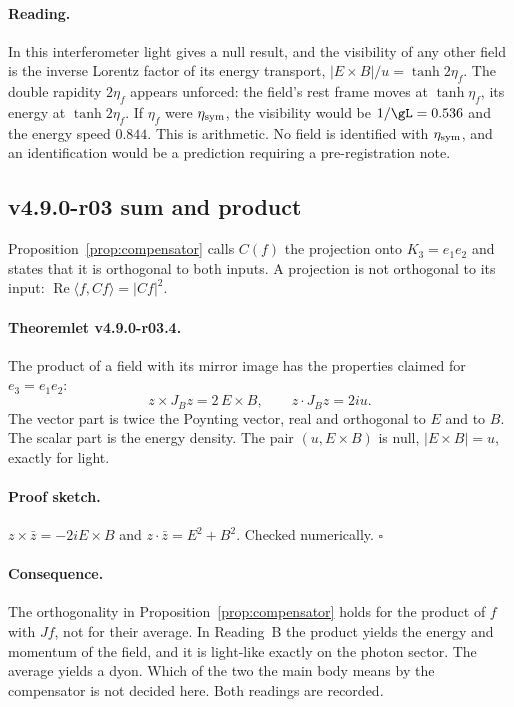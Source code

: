 \paragraph{Reading.}
In this interferometer light gives a null result, and the visibility of any other field is the inverse Lorentz factor of
its energy transport, \(|E\times B|/u=\tanh2\eta_f\).  The double rapidity \(2\eta_f\) appears unforced: the field's rest
frame moves at \(\tanh\eta_f\), its energy at \(\tanh2\eta_f\).  If \(\eta_f\) were \(\eta_{\rm sym}\), the visibility would be
\(1/\gL=0.536\) and the energy speed \(0.844\).  This is arithmetic.  No field is identified with \(\eta_{\rm sym}\), and an
identification would be a prediction requiring a pre-registration note.

\subsection*{v4.9.0-r03 sum and product}
\label{subsec:v490-r03-product}

Proposition~\ref{prop:compensator} calls \(C(f)\) the projection onto \(K_3=e_1e_2\) and states that it is orthogonal to
both inputs.  A projection is not orthogonal to its input: \(\operatorname{Re}\langle f,Cf\rangle=|Cf|^2\).

\paragraph{Theoremlet v4.9.0-r03.4.}
The product of a field with its mirror image has the properties claimed for \(e_3=e_1e_2\):
\[
z\times J_Bz=2\,E\times B,\qquad z\cdot J_Bz=2iu .
\]
The vector part is twice the Poynting vector, real and orthogonal to \(E\) and to \(B\).  The scalar part is the energy
density.  The pair \((u,E\times B)\) is null, \(|E\times B|=u\), exactly for light.

\paragraph{Proof sketch.}
\(z\times\bar z=-2iE\times B\) and \(z\cdot\bar z=E^2+B^2\).  Checked numerically.  \(\square\)

\paragraph{Consequence.}
The orthogonality in Proposition~\ref{prop:compensator} holds for the product of \(f\) with \(Jf\), not for their
average.  In Reading~B the product yields the energy and momentum of the field, and it is light-like exactly on the
photon sector.  The average yields a dyon.  Which of the two the main body means by the compensator is not decided here.
Both readings are recorded.

